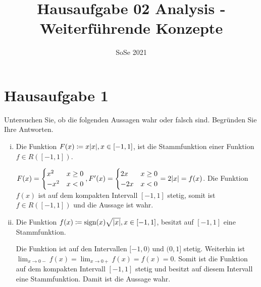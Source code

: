 \documentclass{article}
\author{}
\date{SoSe 2021}
\title{Hausaufgabe 02 Analysis - Weiterführende Konzepte}
\begin{document}
\section*{Hausaufgabe 1}

Untersuchen Sie, ob die folgenden Aussagen wahr oder falsch sind.
Begründen Sie Ihre Antworten.

\begin{enumerate}[(i)]
\item Die Funktion $F(x) \coloneqq x\abs{x}, x \in [-1,1]$, ist die Stammfunktion einer
  Funktion $f \in R([-1, 1])$.

  \label{dia:1.1}

  $F(x) = \begin{cases}
    x^2 & x \geq 0 \\
    - x^2 & x < 0 \\
  \end{cases}, F'(x) = \begin{cases}
    2x & x \geq 0 \\
    -2x & x < 0 \\
  \end{cases} = 2 \abs{x} = f(x)$.
  Die Funktion $f(x)$ ist auf dem kompakten Intervall $[-1, 1]$ stetig, somit ist
  $f \in R([-1, 1])$ und die Aussage ist wahr.
  
\item Die Funktion $f(x) \coloneqq \text{sign}(x) \sqrt{\abs{x}}, x \in [-1,1]$, besitzt
  auf $[-1,1]$ eine Stammfunktion.

  \label{dia:1.2}

  Die Funktion ist auf den Intervallen $[-1, 0)$ und $(0, 1]$ stetig.
  Weiterhin ist $\lim_{x \to 0-} f(x) = \lim_{x \to 0+} f(x) = f(x) = 0$.
  Somit ist die Funktion auf dem kompakten Intervall $[-1, 1]$ stetig und
  besitzt auf diesem Intervall eine Stammfunktion.
  Damit ist die Aussage wahr.


\end{enumerate}
\end{document}
